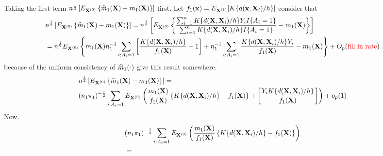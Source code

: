 \documentclass[useAMS,usenatbib,referee]{biom}
\begin{document}
Taking the first term $n^{\frac{1}{2}}\left[E_{{\bf X}^{(0)}}\left \{ {\widehat m}_1({\bf X}) - m_1({\bf X})\right\}\right]$ first. Let $f_1({\bf x}) = E_{{\bf X}^{(1)}}[K\{d({\bf x}, {\bf X}_i)/h\}]$ consider that
\begin{align*}
    &n^{\frac{1}{2}}\left[E_{{\bf X}^{(0)}}\left \{ {\widehat m}_1({\bf X}) - m_1({\bf X})\right\}\right] = n^{\frac{1}{2}} \left[E_{{\bf X}^{(0)}}\left \{ \frac{\sum_{i=1}^n K\{d({\bf X}, {\bf X}_i)/h\}Y_iI\{A_i = 1\}}{\sum_{i=1}^n K\{d({\bf X}, {\bf X}_i)/h\}I\{A_i = 1\}}  - m_1({\bf X})\right\}\right]\\
    &= n^{\frac{1}{2}} E_{{\bf X}^{(0)}}\left \{m_1({\bf X})n_1^{-1}\sum_{i : A_i = 1}\left[\frac{K\{d({\bf X}, {\bf X}_i)/h\}}{f_1({\bf X})} - 1\right] + n_1^{-1}\sum_{i : A_i = 1}\frac{K\{d({\bf X}, {\bf X}_i)/h\}Y_i}{f_1({\bf X})} - m_1({\bf X})
    \right\} + O_p(\text{\color{red} fill in rate})
\end{align*}
because of the uniform consistency of ${\widehat m}_1(\cdot)$ {\color{red} give this result somewhere}. 
\begin{align*}
    &n^{\frac{1}{2}}\left[E_{{\bf X}^{(0)}}\left \{ {\widehat m}_1({\bf X}) - m_1({\bf X})\right\}\right] = \\
    &(n_1\pi_1)^{-\frac{1}{2}}\sum_{i : A_i = 1}E_{{\bf X}^{(0)}}\left(\frac{m_1({\bf X})}{f_1({\bf X})}\left\{K\{d({\bf X}, {\bf X}_i)/h\} - f_1({\bf X})\right\} + \left[\frac{Y_iK\{d({\bf X}, {\bf X}_i)/h\}}{f_1({\bf X})} \right] \right) + o_p(1)
\end{align*}
Now,
\begin{align*}
    &(n_1\pi_1)^{-\frac{1}{2}}\sum_{i : A_i = 1}E_{{\bf X}^{(0)}}\left(\frac{m_1({\bf X})}{f_1({\bf X})}\left\{K\{d({\bf X}, {\bf X}_i)/h\} - f_1({\bf X})\right\}\right)\\
    &= 
\end{align*}

\label{lastpage}
\end{document}
